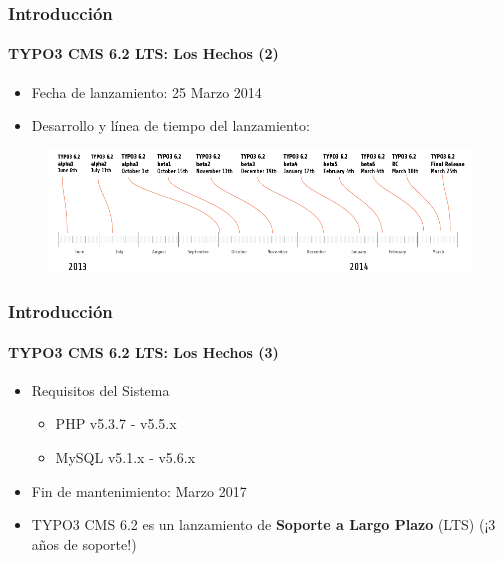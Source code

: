 
\begin{frame}[fragile]

	\frametitle{Introducción}
	\framesubtitle{TYPO3 CMS 6.2 LTS: Los Hechos (2)}

	\begin{itemize}
		\item Fecha de lanzamiento: 25 Marzo 2014
		\item Desarrollo y línea de tiempo del lanzamiento:
	\end{itemize}

	\begin{figure}
		\includegraphics[width=0.99\linewidth]{Images/Introduction/ReleaseTimeline.png}
	\end{figure}

\end{frame}


\begin{frame}[fragile]
	\frametitle{Introducción}
	\framesubtitle{TYPO3 CMS 6.2 LTS: Los Hechos (3)}

	\begin{itemize}
		\item Requisitos del Sistema
		\begin{itemize}
			\item PHP	\tabto{1.2cm} v5.3.7 - v5.5.x
			\item MySQL	\tabto{1.2cm} v5.1.x - v5.6.x
		\end{itemize}
	\end{itemize}

	\begin{itemize}
		\item Fin de mantenimiento: Marzo 2017
		\item TYPO3 CMS 6.2 es un lanzamiento de \textbf{Soporte a Largo Plazo} (LTS) (¡3 años de soporte!)
	\end{itemize}

\end{frame}

